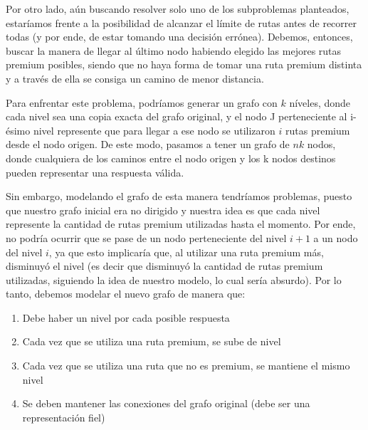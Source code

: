 Por otro lado, aún buscando resolver solo uno de los subproblemas planteados, estaríamos frente a la posibilidad de alcanzar el límite de rutas antes de recorrer todas (y por ende, de estar tomando una decisión errónea). Debemos, entonces, buscar la manera de llegar al último nodo habiendo elegido las mejores rutas premium posibles, siendo que no haya forma de tomar una ruta premium distinta y a través de ella se consiga un camino de menor distancia.
\\
\par
Para enfrentar este problema, podríamos generar un grafo con $k$ níveles, donde cada nivel sea una copia exacta del grafo original, y el nodo J perteneciente al i-ésimo nivel represente que para llegar a ese nodo se utilizaron $i$ rutas premium desde el nodo origen. De este modo, pasamos a tener un grafo de $nk$ nodos, donde cualquiera de los caminos entre el nodo origen y los k nodos destinos pueden representar una respuesta válida.
\\
\par
Sin embargo, modelando el grafo de esta manera tendríamos problemas, puesto que nuestro grafo inicial era no dirigido y nuestra idea es que cada nivel represente la cantidad de rutas premium utilizadas hasta el momento. Por ende, no podría ocurrir que se pase de un nodo perteneciente del nivel $i+1$ a un nodo del nivel $i$, ya que esto implicaría que, al utilizar una ruta premium más, disminuyó el nivel (es decir que disminuyó la cantidad de rutas premium utilizadas, siguiendo la idea de nuestro modelo, lo cual sería absurdo). Por lo tanto, debemos modelar el nuevo grafo de manera que:
\begin{enumerate}
\item Debe haber un nivel por cada posible respuesta
\item Cada vez que se utiliza una ruta premium, se sube de nivel
\item Cada vez que se utiliza una ruta que no es premium, se mantiene el mismo nivel
\item Se deben mantener las conexiones del grafo original (debe ser una representación fiel)
\end{enumerate}

